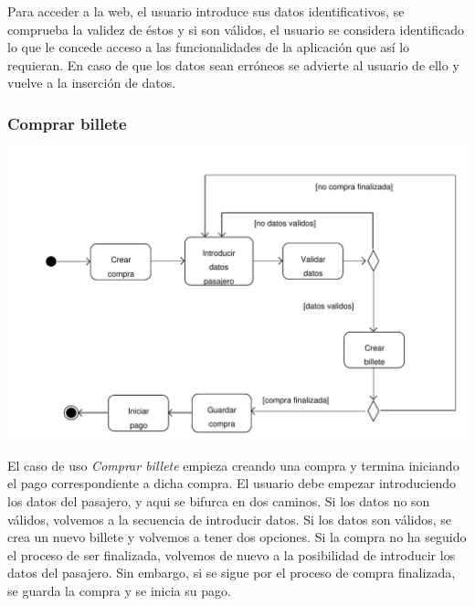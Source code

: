 \documentclass[11pt, a4paper, twoside, titlepage]{article}
\begin{document}
				Para acceder a la web, el usuario introduce sus datos identificativos, se comprueba la validez de éstos y si son válidos, el usuario se considera identificado lo que le concede acceso a las funcionalidades de la aplicación que así lo requieran. En caso de que los datos sean erróneos se advierte al usuario de ello y vuelve a la inserción de datos.

			\subsubsection{Comprar billete}
				\begin{center}
					\includegraphics[scale=.72]{analisis/diagramas/da_comprarbillete.pdf}
				\end{center}
				El caso de uso {\itshape Comprar billete} empieza creando una compra y termina iniciando el pago correspondiente a dicha compra.
				El usuario debe empezar introduciendo los datos del pasajero, y aqui se bifurca en dos caminos. Si los datos no son válidos, volvemos a la secuencia de introducir datos. Si los datos son válidos, se crea un nuevo billete y volvemos a tener dos opciones. Si la compra no ha seguido el proceso de ser finalizada, volvemos de nuevo a la posibilidad de introducir los datos del pasajero. Sin embargo, si se sigue por el proceso de compra finalizada, se guarda la compra y se inicia su pago.
\end{document}
